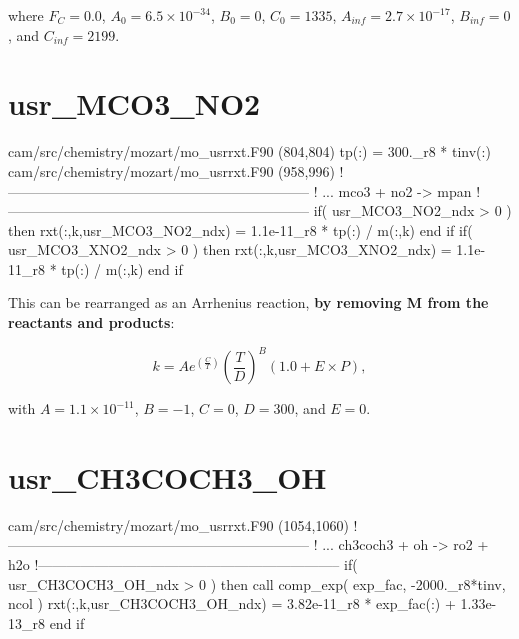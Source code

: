 \documentclass[titlepage]{article}
\begin{document}
\noindent where $F_C = 0.0$, $A_0 = 6.5 \times 10^{-34}$, $B_0 = 0$, $C_0 = 1335$, $A_{inf} = 2.7 \times 10^{-17}$, $B_{inf} = 0$, and $C_{inf} = 2199$.



\section{usr\_MCO3\_NO2}

\begin{blockcode}[commandchars=\\\{\}]
\color{gray}cam/src/chemistry/mozart/mo_usrrxt.F90 (804,804)
       tp(:)             = 300._r8 * tinv(:)
\color{gray}cam/src/chemistry/mozart/mo_usrrxt.F90 (958,996)
!-----------------------------------------------------------------
!     ... mco3 + no2 -> mpan
!-----------------------------------------------------------------
       if( usr_MCO3_NO2_ndx > 0 ) then
          rxt(:,k,usr_MCO3_NO2_ndx) = 1.1e-11_r8 * tp(:) / m(:,k)
       end if
       if( usr_MCO3_XNO2_ndx > 0 ) then
          rxt(:,k,usr_MCO3_XNO2_ndx) = 1.1e-11_r8 * tp(:) / m(:,k)
       end if
\end{blockcode}

This can be rearranged as an Arrhenius reaction, \textbf{by removing M from the reactants and products}:

\begin{equation}
k = Ae^{(\frac{C}{T})}(\frac{T}{D})^B(1.0+E \times P),
\end{equation}

\noindent with $A = 1.1 \times 10^{-11}$, $B = -1$, $C = 0$, $D = 300$, and $E = 0$.


\section{usr\_CH3COCH3\_OH}

\begin{blockcode}[commandchars=\\\{\}]
\color{gray}cam/src/chemistry/mozart/mo_usrrxt.F90 (1054,1060)
!-----------------------------------------------------------------
!       ... ch3coch3 + oh -> ro2 + h2o
!-----------------------------------------------------------------
       if( usr_CH3COCH3_OH_ndx > 0 ) then
          call comp_exp( exp_fac, -2000._r8*tinv, ncol )
          rxt(:,k,usr_CH3COCH3_OH_ndx) = 3.82e-11_r8 * exp_fac(:) + 1.33e-13_r8
       end if
\end{blockcode}
\end{document}
